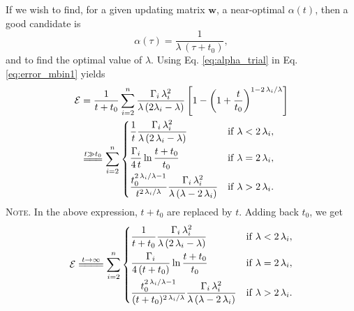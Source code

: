 \documentclass[reprint]{revtex4-1}
\newcommand{\note}[1]{{\color{DarkGreen}\footnotesize \textsc{Note.} #1}}
\begin{document}
If we wish to find,
for a given updating matrix $\mathbf w$,
a near-optimal $\alpha(t)$,
%
then a good candidate is
%
\begin{equation}
\alpha(\tau) = \frac{1}{\lambda \, (\tau + t_0) },
\label{eq:alpha_trial}
\end{equation}
%
and to find the optimal value of $\lambda$.
%
Using Eq. \eqref{eq:alpha_trial}
in Eq. \eqref{eq:error_mbin1} yields
%
\begin{align}
\mathcal E
&=
\frac{1}{t+t_0}
\sum_{i=2}^n
  \frac{       \Gamma_i \, \lambda_i^2      }
       { \lambda \, (2 \lambda_i - \lambda) }
\left[
  1 - \left(
        1 + \frac{ t }{ t_0 }
      \right)^{1 - 2 \, \lambda_i/\lambda}
\right]
\notag
\\
&\stackrel{      t \gg t_0      }
          { =\joinrel=\joinrel= }
%
\sum_{i = 2}^n
\begin{dcases}
  \frac{ 1 }
       { t }
  \frac{         \Gamma_i \, \lambda_i^2       }
       { \lambda \, (2 \, \lambda_i - \lambda) }
  &
  \mathrm{if \;} \lambda < 2 \, \lambda_i,
  \\%
  \frac{ \Gamma_i }
       {  4 \, t  }
  \ln \frac{ t + t_0 }
           {  t_0    }
  &
  \mathrm{if \;} \lambda = 2 \, \lambda_i,
  \\%
  \frac{ t_0^{ 2 \, \lambda_i / \lambda  - 1 } }
       {   t^{ 2 \, \lambda_i / \lambda      } }
  \frac{      \Gamma_i \, \lambda_i^2          }
       { \lambda \, (\lambda - 2 \, \lambda_i) }
  &
  \mathrm{if \;} \lambda > 2 \, \lambda_i.
\end{dcases}
\label{eq:y2_sum_perfect_invt}
\end{align}
%
\note{In the above expression,
$t + t_0$ are replaced by $t$.
%
Adding back $t_0$, we get
$$
\begin{aligned}
  \mathcal E
  \stackrel{         t \to \infty         }
           { =\joinrel=\joinrel=\joinrel= }
  \sum_{i = 2}^n
  \begin{dcases}
    \frac{    1    }
         { t + t_0 }
    \frac{       \Gamma_i \, \lambda_i^2         } 
         { \lambda \, (2 \, \lambda_i - \lambda) }
    &
    \mathrm{if \;} \lambda < 2 \, \lambda_i,
    \\%
    \frac{    \Gamma_i    }
         { 4 \, (t + t_0) }
    \ln \frac{ t + t_0 }
             {   t_0  }
    &
    \mathrm{if \;} \lambda = 2 \, \lambda_i,
    \\
    \frac{  t_0^{ 2 \, \lambda_i / \lambda  - 1}  }
         { (t + t_0)^{ 2 \, \lambda_i / \lambda } }
    \frac{      \Gamma_i \, \lambda_i^2          }
         { \lambda \, (\lambda - 2 \, \lambda_i) }
    &
    \mathrm{if \;} \lambda > 2 \, \lambda_i.
  \end{dcases}
\end{aligned}
$$
}
\end{document}
